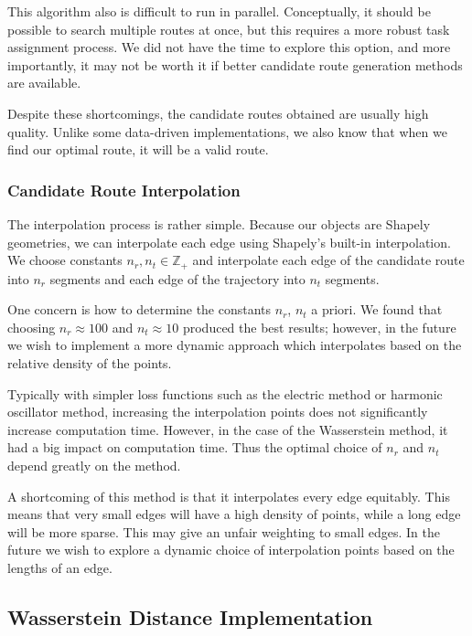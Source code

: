 \documentclass{article}
\numberwithin{equation}{section}
\theoremstyle{definition}
\newcommand{\Z}{\mathbb{Z}}
\begin{document}
This algorithm also is difficult to run in parallel. Conceptually, it should be possible to search multiple routes at once, but this requires a more robust task assignment process. We did not have the time to explore this option, and more importantly, it may not be worth it if better candidate route generation methods are available.

Despite these shortcomings, the candidate routes obtained are usually high quality. Unlike some data-driven implementations, we also know that when we find our optimal route, it will be a valid route.

\subsubsection{Candidate Route Interpolation}

The interpolation process is rather simple. Because our objects are Shapely geometries, we can interpolate each edge using Shapely's built-in interpolation. We choose constants $n_r,n_t \in \Z_+$ and interpolate each edge of the candidate route into $n_r$ segments and each edge of the trajectory into $n_t$ segments.

One concern is how to determine the constants $n_r$, $n_t$ a priori. We found that choosing $n_r \approx 100$ and $n_t \approx 10$ produced the best results; however, in the future we wish to implement a more dynamic approach which interpolates based on the relative density of the points.

Typically with simpler loss functions such as the electric method or harmonic oscillator method, increasing the interpolation points does not significantly increase computation time. However, in the case of the Wasserstein method, it had a big impact on computation time. Thus the optimal choice of $n_r$ and $n_t$ depend greatly on the method.

A shortcoming of this method is that it interpolates every edge equitably. This means that very small edges will have a high density of points, while a long edge will be more sparse. This may give an unfair weighting to small edges. In the future we wish to explore a dynamic choice of interpolation points based on the lengths of an edge.

\subsection{Wasserstein Distance Implementation}\label{WassSection}
\end{document}
